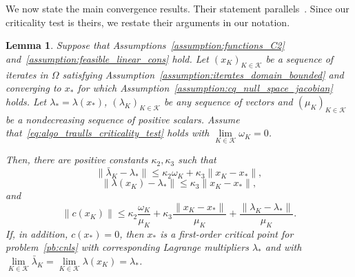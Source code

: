 \documentclass{article}
\numberwithin{equation}{section}
\newcommand{\calK}{{\mathcal{K}}}
\theoremstyle{plain}
\newtheorem{lemma}[theorem]{Lemma}
\begin{document}
We now state the main convergence results. Their statement parallels~\cite[Lemma~4.4 and Theorem~4.6]{conn-etal:1996b}. Since our criticality test is theirs, we restate their arguments in our notation. 
\begin{lemma}\label{lemma:key_lemma}
	Suppose that Assumptions~\ref{assumption:functions_C2} and~\ref{assumption:feasible_linear_cons} hold. Let $\left(x_K\right)_{K\in \calK}$ be a sequence of iterates in $\Omega$ satisfying Assumption~\ref{assumption:iterates_domain_bounded} and converging to $x_*$ for which Assumption~\ref{assumption:cq_null_space_jacobian} holds. Let $\lambda_* = \lambda(x_*)$, $(\lambda_K)_{K \in \calK}$ be any sequence of vectors and $(\mu_K)_{K \in \calK}$ be a nondecreasing sequence of positive scalars. Assume that~\eqref{eq:algo_traulls_criticality_test} holds with $\lim\limits_{K \in \calK}\omega_K = 0$.
	
		Then, there are positive constants $\kappa_2, \kappa_3$ such that
		\begin{equation}\label{eq:bound_1st_order_mult}
			\|\bar{\lambda}_K - \lambda_* \| \le \kappa_2 \omega_K + \kappa_3 \|x_K-x_*\|,
		\end{equation}
		\begin{equation}\label{eq:bound_ls_mult}
			\|\lambda(x_K) - \lambda_* \| \le \kappa_3 \|x_K-x_*\|,
		\end{equation}
		and
		\begin{equation}\label{eq:bound_norm_cons}
			\|c(x_K)\| \le \kappa_2 \frac{\omega_K}{\mu_K} + \kappa_3 \frac{\|x_K-x_*\|}{\mu_K} + \frac{\|\lambda_K - \lambda_* \|}{\mu_K}.
		\end{equation}
		If, in addition, $c(x_*) = 0$, then $x_*$ is a first-order critical point for problem~\eqref{pb:cnls} with corresponding Lagrange multipliers $\lambda_*$ and with $\lim\limits_{K \in \calK} \bar{\lambda}_K = \lim\limits_{K \in \calK} \lambda(x_K) = \lambda_*$.
	\end{lemma}
\end{document}

